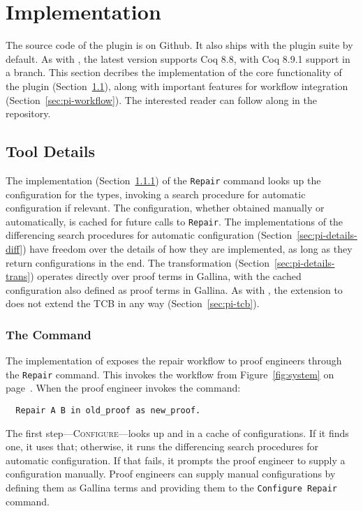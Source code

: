 \section{Implementation}
\label{sec:pi-implementation}

The source code of the \toolnamec plugin is on Github.
It also ships with the \sysnamelong plugin suite by default.
As with \sysname, the latest version supports Coq 8.8, with Coq 8.9.1 support in a branch.
This section decribes the implementation of the core functionality of the \toolnamec plugin (Section~\ref{sec:pi-details}),
along with important features for workflow integration (Section~\ref{sec:pi-workflow}).
The interested reader can follow along in the repository.

\subsection{Tool Details}
\label{sec:pi-details}

The implementation (Section~\ref{sec:pi-details-command}) of the \lstinline{Repair} command
looks up the configuration for the types, invoking a search procedure for automatic configuration if relevant.
The configuration, whether obtained manually or automatically, is cached for future calls to \lstinline{Repair}.
The implementations of the differencing search procedures for automatic configuration (Section~\ref{sec:pi-details-diff})
have freedom over the details of how they are implemented, as long as they return configurations in the end.
The transformation (Section~\ref{sec:pi-details-trans}) operates directly over proof terms in Gallina, with the cached configuration
also defined as proof terms in Gallina.
As with \sysname, the \toolnamec extension to \sysnamelong does not extend the TCB in any way (Section~\ref{sec:pi-tcb}).

\subsubsection{The Command}
\label{sec:pi-details-command}

The implementation of \toolnamec exposes the repair workflow
to proof engineers through the \lstinline{Repair} command. %
This invokes the workflow from Figure~\ref{fig:system} on page~\pageref{fig:system}.
When the proof engineer invokes the command:

\begin{lstlisting}
  Repair A B in old_proof as new_proof.
\end{lstlisting}
The first step---\textsc{Configure}---looks up \Aa and \B in a cache of configurations.
If it finds one, it uses that; otherwise, it runs the differencing search procedures for automatic configuration.
If that fails, it prompts the proof engineer to supply a configuration manually.
Proof engineers can supply manual configurations by defining them as Gallina terms and
providing them to the \lstinline{Configure Repair} command.


